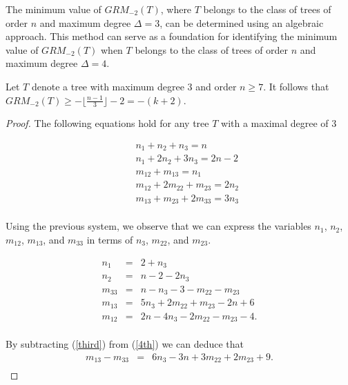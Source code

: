 \documentclass[preprint,12pt]{elsarticle}
\begin{document}
The minimum value of $GRM_{-2}(T)$, where $T$ belongs to the class of trees of order $n$ and maximum degree $\Delta = 3$, can be determined using an algebraic approach. This method can serve as a foundation for identifying the minimum value of $GRM_{-2}(T)$ when $T$ belongs to the class of trees of order $n$ and maximum degree $\Delta = 4$.

\begin{theorem}
Let $T$ denote a tree with maximum degree $3$ and order $n\geq 7$. 
It follows that $GRM_{-2}(T)\geq -\lfloor \frac{n-1}{3} \rfloor-2=-(k+2)$. %
\end{theorem}
\begin{proof}
The following equations hold for any tree $T$ with a maximal degree of $3$

\begin{eqnarray}
    &&n_1 + n_2 + n_3  = n \nonumber\\ 
    &&n_1 + 2n_2 + 3n_3 = 2n-2 \nonumber\\ 
    &&m_{12} + m_{13}  = n_1 \label{1st}\\
    &&m_{12} + 2m_{22} + m_{23}  = 2n_2 \nonumber \\ 
    &&m_{13} + m_{23} + 2m_{33}  = 3n_3 \label{second}\\  \nonumber
\end{eqnarray}



Using the previous system, we observe that we can express the variables $n_1$, $n_2$, $m_{12}$, $m_{13}$, and $m_{33}$ in terms of $n_3$, $m_{22}$, and $m_{23}$.

\begin{eqnarray}
    n_1 &=& 2 + n_3\label{2nd}\\
    n_2 &=& n - 2 - 2n_3\label{second'}\\
    m_{33}&=&n-n_3-3-m_{22} - m_{23} \label{third}\\
    m_{13}&=&5n_3+2m_{22} + m_{23}-2n+6 \label{4th}\\
    m_{12}&=&2n-4n_3-2m_{22} - m_{23}-4\label{5th}.\\ \nonumber
\end{eqnarray}

By subtracting   (\ref{third}) from (\ref{4th}) we can deduce that 
\begin{eqnarray}
    m_{13}-m_{33}&=& 6n_3-3n+3m_{22}+2m_{23}+9 \label{6th}.  \\ \nonumber
 \end{eqnarray}


\end{proof}
\end{document}
